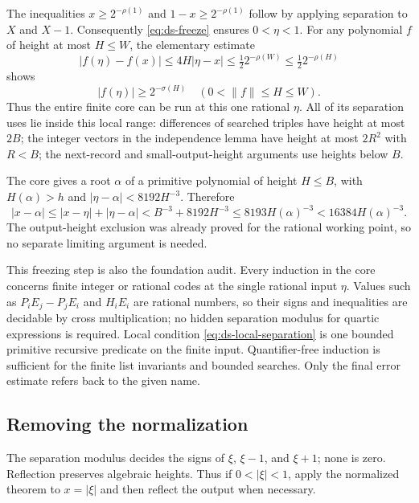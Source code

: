 The inequalities $x\geq2^{-\rho(1)}$ and
$1-x\geq2^{-\rho(1)}$ follow by applying separation to $X$ and $X-1$.
Consequently \eqref{eq:ds-freeze} ensures $0<\eta<1$.  For any polynomial
$f$ of height at most $H\leq W$, the elementary estimate
\[
 |f(\eta)-f(x)|\leq4H|\eta-x|
 \leq\tfrac12 2^{-\rho(W)}
 \leq\tfrac12 2^{-\rho(H)}
\]
shows
\begin{equation}\label{eq:ds-local-separation}
 |f(\eta)|\geq2^{-\sigma(H)}
 \quad(0<\|f\|\leq H\leq W).
\end{equation}
Thus the entire finite core can be run at this one rational $\eta$.
All of its separation uses lie inside this local range: differences of
searched triples have height at most $2B$; the integer vectors in the
independence lemma have height at most $2R^2$ with $R<B$; the next-record
and small-output-height arguments use heights below $B$.

The core gives a root $\alpha$ of a primitive polynomial of height
$H\leq B$, with $H(\alpha)>h$ and
$|\eta-\alpha|<8192H^{-3}$.  Therefore
\[
 |x-\alpha|
 \leq|x-\eta|+|\eta-\alpha|
 <B^{-3}+8192H^{-3}
 \leq8193H(\alpha)^{-3}
 <16384H(\alpha)^{-3}.
\]
The output-height exclusion was already proved for the rational working
point, so no separate limiting argument is needed.

This freezing step is also the foundation audit.  Every induction in
the core concerns finite integer or rational codes at the single rational
input $\eta$.  Values such as $P_iE_j-P_jE_i$ and $H_iE_i$ are rational
numbers, so their signs and inequalities are decidable by cross
multiplication; no hidden separation modulus for quartic expressions is
required.  Local condition \eqref{eq:ds-local-separation} is one bounded
primitive recursive predicate on the finite input.  Quantifier-free
induction is sufficient for the finite list invariants and bounded
searches.  Only the final error estimate refers back to the given name.

\subsection{Removing the normalization}

The separation modulus decides the signs of $\xi$, $\xi-1$, and
$\xi+1$; none is zero.  Reflection preserves algebraic heights.  Thus
if $0<|\xi|<1$, apply the normalized theorem to $x=|\xi|$ and then
reflect the output when necessary.

